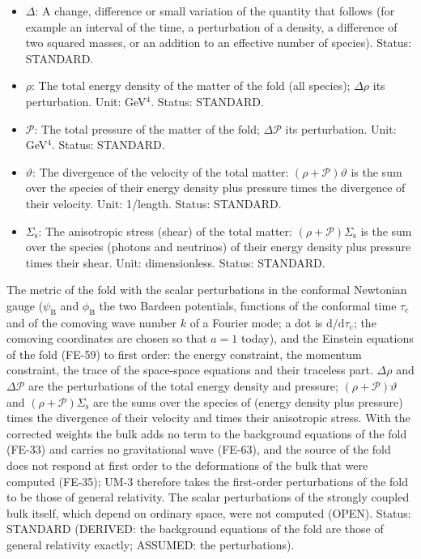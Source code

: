 \documentclass[
  10pt,
]{article}
\begin{document}
\begin{itemize}
  Value: \(6.708\times10^{-39}\) GeV\(^{-2}\). Status: STANDARD.
\item
  \(\Delta\): A change, difference or small variation of the quantity
  that follows (for example an interval of the time, a perturbation of a
  density, a difference of two squared masses, or an addition to an
  effective number of species). Status: STANDARD.
\item
  \(\rho\): The total energy density of the matter of the fold (all
  species); \(\Delta\rho\) its perturbation. Unit: GeV\(^4\). Status:
  STANDARD.
\item
  \(\mathcal{P}\): The total pressure of the matter of the fold;
  \(\Delta\mathcal{P}\) its perturbation. Unit: GeV\(^4\). Status:
  STANDARD.
\item
  \(\vartheta\): The divergence of the velocity of the total matter:
  \((\rho + \mathcal{P})\vartheta\) is the sum over the species of their
  energy density plus pressure times the divergence of their velocity.
  Unit: 1/length. Status: STANDARD.
\item
  \(\Sigma_{\mathrm{s}}\): The anisotropic stress (shear) of the total
  matter: \((\rho + \mathcal{P})\Sigma_{\mathrm{s}}\) is the sum over
  the species (photons and neutrinos) of their energy density plus
  pressure times their shear. Unit: dimensionless. Status: STANDARD.
\end{itemize}

The metric of the fold with the scalar perturbations in the conformal
Newtonian gauge (\(\psi_{\mathrm{B}}\) and \(\phi_{\mathrm{B}}\) the two
Bardeen potentials, functions of the conformal time
\(\tau_{\mathrm{c}}\) and of the comoving wave number \(k\) of a Fourier
mode; a dot is \(\mathrm{d}/\mathrm{d}\tau_{\mathrm{c}}\); the comoving
coordinates are chosen so that \(a = 1\) today), and the Einstein
equations of the fold (FE-59) to first order: the energy constraint, the
momentum constraint, the trace of the space-space equations and their
traceless part. \(\Delta\rho\) and \(\Delta\mathcal{P}\) are the
perturbations of the total energy density and pressure;
\((\rho + \mathcal{P})\vartheta\) and
\((\rho + \mathcal{P})\Sigma_{\mathrm{s}}\) are the sums over the
species of (energy density plus pressure) times the divergence of their
velocity and times their anisotropic stress. With the corrected weights
the bulk adds no term to the background equations of the fold (FE-33)
and carries no gravitational wave (FE-63), and the source of the fold
does not respond at first order to the deformations of the bulk that
were computed (FE-35); UM-3 therefore takes the first-order
perturbations of the fold to be those of general relativity. The scalar
perturbations of the strongly coupled bulk itself, which depend on
ordinary space, were not computed (OPEN). Status: STANDARD (DERIVED: the
background equations of the fold are those of general relativity
exactly; ASSUMED: the perturbations).
\end{document}
